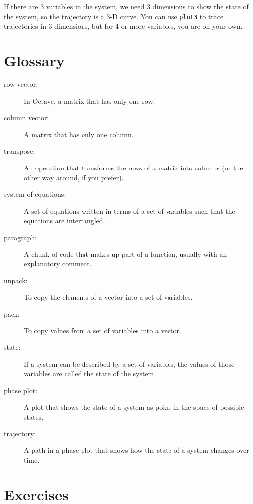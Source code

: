 \documentclass{book}
\begin{document}
If there are 3 variables in the system, we need 3 dimensions to show
the state of the system, so the trajectory is a 3-D curve.
You can use {\tt plot3} to trace trajectories in 3 dimensions,
but for 4 or more variables, you are on your own.


\section{Glossary}

\begin{description}

\item[row vector:] In Octave, a matrix that has only one row. 

\item[column vector:] A matrix that has only one column. 

\item[transpose:] An operation that transforms the rows of a matrix
into columns (or the other way around, if you prefer). 

\item[system of equations:] A set of equations written in terms of
a set of variables such that the equations are intertangled.

\item[paragraph:] A chunk of code that makes up part of a function,
usually with an explanatory comment. 

\item[unpack:] To copy the elements of a vector into a set of variables.

\item[pack:] To copy values from a set of variables into a vector. 

\item[state:] If a system can be described by a set of variables,
the values of those variables are called the state of the system.

\item[phase plot:] A plot that shows the state of a system as point
in the space of possible states. 

\item[trajectory:] A path in a phase plot that shows how the state of
a system changes over time.


\end{description}

\section{Exercises}
\end{document}
